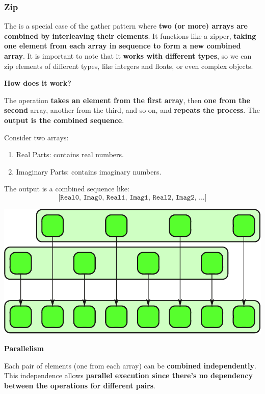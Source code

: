 \subsubsection{Zip}

The  is a special case of the gather pattern where \textbf{two (or more) arrays are combined by interleaving their elements}. It functions like a zipper, \textbf{taking one element from each array in sequence to form a new combined array}. It is important to note that it \textbf{works with different types}, so we can zip elements of different types, like integers and floats, or even complex objects.

\highspace
\begin{flushleft}
    \textcolor{Green3}{ \textbf{How does it work?}}
\end{flushleft}
The operation \textbf{takes an element from the first array}, then \textbf{one from the second} array, another from the third, and so on, and \textbf{repeats the process}. The \textbf{output is the combined sequence}.
\begin{examplebox}
    Consider two arrays:
    \begin{enumerate}
        \item Real Parts: contains real numbers.
        \item Imaginary Parts: contains imaginary numbers.
    \end{enumerate}
    The output is a combined sequence like:
    \begin{equation*}
        \texttt{[Real0, Imag0, Real1, Imag1, Real2, Imag2, ...]}
    \end{equation*}
    \begin{center}
        \includegraphics[width=.7\textwidth]{img/zip-1.pdf}
    \end{center}
\end{examplebox}

\highspace
\begin{flushleft}
    \textcolor{Green3}{ \textbf{Parallelism}}
\end{flushleft}
Each pair of elements (one from each array) can be \textbf{combined independently}. This independence allows \textbf{parallel execution since there's no dependency between the operations for different pairs}.

